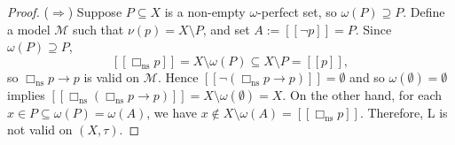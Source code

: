 \documentclass[10pt,a4paper]{amsart}
\newcommand{\sem}[1]{[\![#1]\!]}
\newcommand{\sq}{\Box}
\begin{document}
\begin{proof}
($\Rightarrow$) 
Suppose $P \subseteq X$ is a non-empty $\omega$-perfect set, so
$\omega(P) \supseteq P$. Define a model $\mathcal{M}$ such that $\nu(p) = X \setminus P$,
and set $A := \sem{\neg p} = P$.
Since $\omega(P) \supseteq P$,
\[
  \sem{\sq_\mathrm{ns} p} = X \setminus \omega(P) \subseteq X \setminus P = \sem{p},
\]
so $\sq_\mathrm{ns} p \to p$ is valid on $\mathcal{M}$.
Hence $\sem{\neg(\sq_\mathrm{ns} p \to p)} = \emptyset$ and so 
$\omega(\emptyset) = \emptyset$ implies
$\sem{\sq_\mathrm{ns}(\sq_\mathrm{ns} p \to p)} = X \setminus \omega(\emptyset) = X$.
On the other hand, for each $x \in P \subseteq \omega(P)=\omega(A)$, we have $x \notin X \setminus \omega(A) = \sem{\sq_\mathrm{ns} p}$.
Therefore, L is not valid on $(X,\tau)$.
\end{proof}
\end{document}
